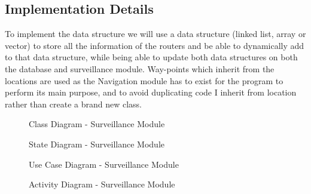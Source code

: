 \documentclass[english]{article}
\begin{document}
        \subsection{Implementation Details}    
            To implement the data structure we will use a data structure (linked list, array or vector) to store all the information of the routers and be able to dynamically add to that data structure, while being able to update both data structures on both the database and surveillance module. Way-points which inherit from the locations are  used as the Navigation module has to exist for the program to perform its main purpose, and to avoid duplicating code I inherit from location rather than create a brand new class.

        \begin{figure}[H]
            \centering              
            \centerline{}
            \caption{Class Diagram - Surveillance Module}
        \end{figure}

        \begin{figure}[H]
            \centering              
            \centerline{}
            \caption{State Diagram - Surveillance Module}
        \end{figure}

        \begin{figure}[H]
            \centering              
            \centerline{}
            \caption{Use Case Diagram - Surveillance Module}
        \end{figure}  
        
        \begin{figure}[H]
            \centering              
            \centerline{}
            \caption{Activity Diagram - Surveillance Module}
        \end{figure}    
\end{document}
